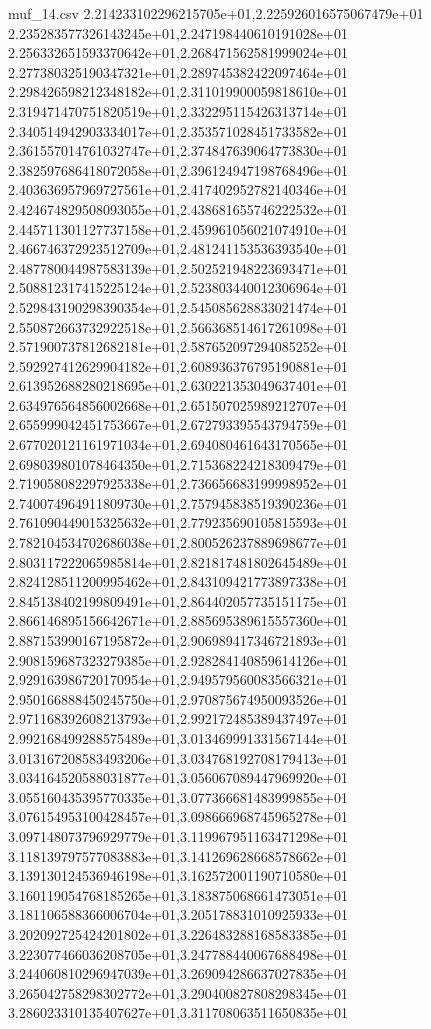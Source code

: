 \begin{filecontents*}{muf_14.csv}
2.214233102296215705e+01,2.225926016575067479e+01
2.235283577326143245e+01,2.247198440610191028e+01
2.256332651593370642e+01,2.268471562581999024e+01
2.277380325190347321e+01,2.289745382422097464e+01
2.298426598212348182e+01,2.311019900059818610e+01
2.319471470751820519e+01,2.332295115426313714e+01
2.340514942903334017e+01,2.353571028451733582e+01
2.361557014761032747e+01,2.374847639064773830e+01
2.382597686418072058e+01,2.396124947198768496e+01
2.403636957969727561e+01,2.417402952782140346e+01
2.424674829508093055e+01,2.438681655746222532e+01
2.445711301127737158e+01,2.459961056021074910e+01
2.466746372923512709e+01,2.481241153536393540e+01
2.487780044987583139e+01,2.502521948223693471e+01
2.508812317415225124e+01,2.523803440012306964e+01
2.529843190298390354e+01,2.545085628833021474e+01
2.550872663732922518e+01,2.566368514617261098e+01
2.571900737812682181e+01,2.587652097294085252e+01
2.592927412629904182e+01,2.608936376795190881e+01
2.613952688280218695e+01,2.630221353049637401e+01
2.634976564856002668e+01,2.651507025989212707e+01
2.655999042451753667e+01,2.672793395543794759e+01
2.677020121161971034e+01,2.694080461643170565e+01
2.698039801078464350e+01,2.715368224218309479e+01
2.719058082297925338e+01,2.736656683199998952e+01
2.740074964911809730e+01,2.757945838519390236e+01
2.761090449015325632e+01,2.779235690105815593e+01
2.782104534702686038e+01,2.800526237889698677e+01
2.803117222065985814e+01,2.821817481802645489e+01
2.824128511200995462e+01,2.843109421773897338e+01
2.845138402199809491e+01,2.864402057735151175e+01
2.866146895156642671e+01,2.885695389615557360e+01
2.887153990167195872e+01,2.906989417346721893e+01
2.908159687323279385e+01,2.928284140859614126e+01
2.929163986720170954e+01,2.949579560083566321e+01
2.950166888450245750e+01,2.970875674950093526e+01
2.971168392608213793e+01,2.992172485389437497e+01
2.992168499288575489e+01,3.013469991331567144e+01
3.013167208583493206e+01,3.034768192708179413e+01
3.034164520588031877e+01,3.056067089447969920e+01
3.055160435395770335e+01,3.077366681483999855e+01
3.076154953100428457e+01,3.098666968745965278e+01
3.097148073796929779e+01,3.119967951163471298e+01
3.118139797577083883e+01,3.141269628668578662e+01
3.139130124536946198e+01,3.162572001190710580e+01
3.160119054768185265e+01,3.183875068661473051e+01
3.181106588366006704e+01,3.205178831010925933e+01
3.202092725424201802e+01,3.226483288168583385e+01
3.223077466036208705e+01,3.247788440067688498e+01
3.244060810296947039e+01,3.269094286637027835e+01
3.265042758298302772e+01,3.290400827808298345e+01
3.286023310135407627e+01,3.311708063511650835e+01

\end{filecontents*}
